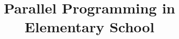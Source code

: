 \documentclass{sig-alternate}
\begin{document}
%

\title{Parallel Programming in Elementary School}
%
%
%
%
%
\end{document}
